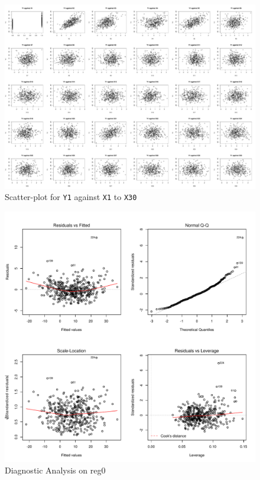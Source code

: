 \documentclass[11pt,oneside,a4paper]{article}
\newcommand{\m}[1]{\texttt{{#1}}}
\begin{document}
\begin{landscape}
\begin{figure}[!ht]
    \centering
	\includegraphics[scale=0.3]{./pic/fig5_scatterPlot.pdf}
    \caption{Scatter-plot for \m{Y1} against \m{X1} to \m{X30}}
 	\label{scatterY1}
\end{figure}

\end{landscape}

\begin{figure}[!ht]
    \centering
	\includegraphics[scale=0.8]{./pic/reg_reg0.pdf}
    \caption{Diagnostic Analysis on reg0}
 	\label{Diagreg0}
\end{figure}
\end{document}
